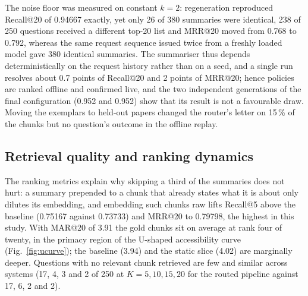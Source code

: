 \documentclass[pdflatex,sn-mathphys-num]{sn-jnl}
\makeatletter
\newif\ifprovenance
\newcommand{\verify}[1]{\ifprovenance\textcolor{red}{{\footnotesize [VERIFY: #1]}}\fi}
\newcommand{\Rec}[1]{Recall@#1}
\newcommand{\MRR}[1]{MRR@#1}
\newcommand{\MAR}[1]{MAR@#1}
\theoremstyle{thmstyleone}%
\theoremstyle{thmstylethree}%
\makeatother
\begin{document}
The noise floor was measured on constant $k=2$: regeneration reproduced \Rec{20} of 0.94667 exactly, yet only 26 of 380 summaries were identical, 238 of 250 questions received a different top-20 list and \MRR{20} moved from 0.768 to 0.792, whereas the same request sequence issued twice from a freshly loaded model gave 380 identical summaries.\verify{Sect.~3 of \texttt{RnD/router\_prompt\_engineering.md}; \texttt{real\_runs/fixed2.json} (0.94667, MRR 0.79227) versus the table \texttt{ablation\_doc\_slice\_radius\_2} (0.94667, MRR 0.76799); summary and top-20 comparison by \texttt{scripts/compare\_runs.py}; \texttt{tables1} versus \texttt{tables1\_run2} identical (380/380 summaries)} The summariser thus depends deterministically on the request history rather than on a seed, and a single run resolves about 0.7 points of \Rec{20} and 2 points of \MRR{20}; hence policies are ranked offline and confirmed live, and the two independent generations of the final configuration (0.952 and 0.952) show that its result is not a favourable draw. Moving the exemplars to held-out papers changed the router's letter on 15\,\% of the chunks but no question's outcome in the offline replay.\verify{Sect.~8 of \texttt{RnD/router\_prompt\_engineering.md}; letter agreement 287/338 between \texttt{results/routes\_binary.json} and \texttt{results/routes\_binary\_heldout.json} via \texttt{scripts/compare\_routes.py}; the two final generations are rows 2026-09-25T16:06:28 and 2026-09-25T20:06:47 of \texttt{emissions.csv}}

\subsection{Retrieval quality and ranking dynamics}\label{sec:ranking}

The ranking metrics explain why skipping a third of the summaries does not hurt: a summary prepended to a chunk that already states what it is about only dilutes its embedding, and embedding such chunks raw lifts \Rec{5} above the baseline (0.75167 against 0.73733) and \MRR{20} to 0.79798, the highest in this study. With \MAR{20} of 3.91 the gold chunks sit on average at rank four of twenty, in the primacy region of the U-shaped accessibility curve (Fig.~\ref{fig:ucurve}); the baseline (3.94) and the static slice (4.02) are marginally deeper. Questions with no relevant chunk retrieved are few and similar across systems (17, 4, 3 and 2 of 250 at $K=5,10,15,20$ for the routed pipeline against 17, 6, 2 and 2).\verify{\Rec{5}, MRR, MAR and NaN counts from the printouts of \texttt{RnD/benchmarking\_retrievals.ipynb}; baseline NaN counts 17/6/2/2 from \texttt{res\_anthropic\_control\_table.json} in \texttt{RnD/dynamic\_slice\_length/router\_experiments/results/}}
\end{document}
